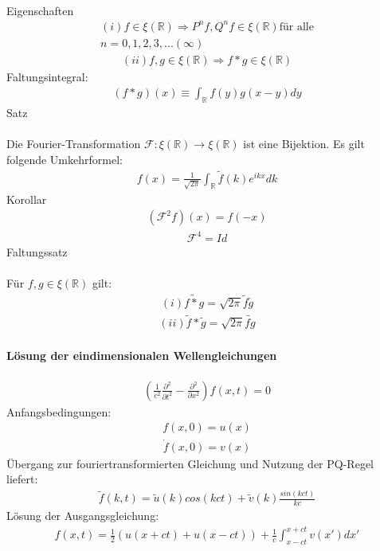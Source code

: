 \documentclass[10pt,a4paper]{article}
\begin{document}
\\
Eigenschaften
\begin{align}
(i) f \in \xi (\mathbb{R}) \Rightarrow P^nf, Q^nf \in \xi (\mathbb{R}) \text{für alle} \\ n=0,1,2,3,...(\infty)
\end{align}
\begin{align}
(ii) f,g \in \xi (\mathbb{R}) \Rightarrow f * g \in \xi (\mathbb{R})
\end{align}
Faltungsintegral:
\begin{align}
(f*g)(x)\equiv \int_{\mathbb{R}} f(y) g(x-y) dy
\end{align}
Satz\\
\\
Die Fourier-Transformation $ \mathcal{F}: \xi(\mathbb{R}) \longrightarrow \xi (\mathbb{R}) $ ist eine Bijektion. Es gilt folgende Umkehrformel:
\begin{align}
f(x)=\frac{1}{\sqrt{2 \pi}} \int_{\mathbb{R}} \tilde{f}(k) e^{ikx} dk
\end{align}
Korollar
\begin{align}
(\mathcal{F}^2f)(x)=f(-x)
\end{align}
\begin{align}
\mathcal{F}^4=Id
\end{align}
Faltungssatz\\
\\
Für $f,g \in \xi (\mathbb{R}) $ gilt:
\begin{align}
(i) \tilde{f*g} = \sqrt{2 \pi} \tilde{f} \tilde{g}
\end{align}
\begin{align}
(ii) \tilde{f} * \tilde{g}= \sqrt{2 \pi} \tilde{fg}
\end{align}
\paragraph{Lösung der eindimensionalen Wellengleichungen} $\,$\\
\begin{align}
(\frac{1}{c^2} \frac{\partial^2}{\partial t^2} - \frac{\partial^2}{\partial x^2}) f(x,t)=0
\end{align}
Anfangsbedingungen:
\begin{align}
f(x,0)=u(x)
\end{align}
\begin{align}
\dot{f}(x,0)=v(x)
\end{align}
Übergang zur fouriertransformierten Gleichung und Nutzung der PQ-Regel liefert:
\begin{align}
\tilde{f}(k,t)=\tilde{u}(k)cos(kct) + \tilde{v}(k) \frac{sin(kct)}{kc}
\end{align}
Lösung der Ausgangsgleichung:
\begin{align}
f(x,t)= \frac{1}{2}(u(x+ct)+u(x-ct))+ \frac{1}{c} \int_{x-ct}^{x+ct} v(x')dx'
\end{align}
\end{document}
